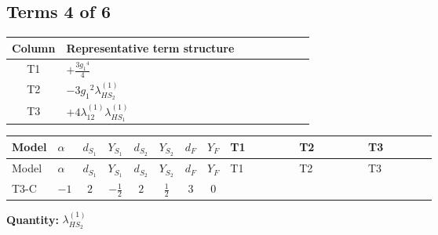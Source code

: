 \documentclass[8pt]{article}
\begin{document}
\begin{landscape}
\subsection*{Terms 4 of 6}
\begin{center}
\begin{tabular}{@{}c >{\raggedright\arraybackslash}p{0.82\linewidth}@{}}
\toprule
Column & Representative term structure \\
\midrule
T1 & \(\displaystyle +\frac{3 {g_1}^4}{4}\) \\
\midrule
T2 & \(\displaystyle -3 {g_1}^2 {\lambda_{HS_2}^{(1)}}\) \\
\midrule
T3 & \(\displaystyle +4 {\lambda_{12}^{(1)}} {\lambda_{HS_1}^{(1)}}\) \\
\midrule
\bottomrule
\end{tabular}
\end{center}
\smallskip
\tiny
\begin{longtable}{@{}llcccccc >{\raggedright\arraybackslash}p{0.21\linewidth} >{\raggedright\arraybackslash}p{0.21\linewidth} >{\raggedright\arraybackslash}p{0.21\linewidth}@{}}
\toprule
Model & $\alpha$ & $d_{S_1}$ & $Y_{S_1}$ & $d_{S_2}$ & $Y_{S_2}$ & $d_F$ & $Y_F$ & T1 & T2 & T3 \\
\midrule
\endfirsthead
\toprule
Model & $\alpha$ & $d_{S_1}$ & $Y_{S_1}$ & $d_{S_2}$ & $Y_{S_2}$ & $d_F$ & $Y_F$ & T1 & T2 & T3 \\
\midrule
\endhead
T3-C & $-1$ & $2$ & $-\frac{1}{2}$ & $2$ & $\frac{1}{2}$ & $3$ & $0$ & \scriptsize\adjustbox{max width=\linewidth}{$\begin{gathered} +\frac{3 {g_1}^4}{4}\end{gathered}$} & \scriptsize\adjustbox{max width=\linewidth}{$\begin{gathered} -3 {g_1}^2 {\lambda_{HS_2}^{(1)}}\end{gathered}$} & \scriptsize\adjustbox{max width=\linewidth}{$\begin{gathered} +4 {\lambda_{12}^{(1)}} {\lambda_{HS_1}^{(1)}}\end{gathered}$} \\
\midrule
\bottomrule
\end{longtable}
\clearpage
\noindent\textbf{Quantity: }$\lambda_{HS_2}^{(1)}$\par\smallskip

\end{landscape}
\end{document}
